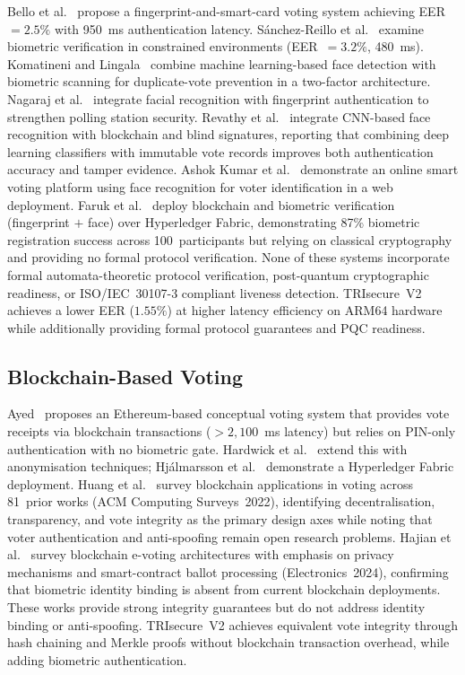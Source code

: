 \documentclass[pdflatex,sn-mathphys-num]{sn-jnl}%
\theoremstyle{thmstyleone}%
\theoremstyle{thmstyletwo}%
\theoremstyle{thmstylethree}%
\begin{document}
Bello et al.~\cite{bello2021biometric} propose a fingerprint-and-smart-card
voting system achieving EER~$=2.5\%$ with 950~ms authentication latency.
S\'{a}nchez-Reillo et al.~\cite{sanchez2020biometric} examine biometric
verification in constrained environments (EER~$=3.2\%$, 480~ms). Komatineni
and Lingala~\cite{komatineni2020biometric} combine machine learning-based face
detection with biometric scanning for duplicate-vote prevention in a two-factor
architecture. Nagaraj et al.~\cite{nagaraj2022voting} integrate facial
recognition with fingerprint authentication to strengthen polling station
security. Revathy et al.~\cite{revathy2022cnn_evoting} integrate CNN-based face
recognition with blockchain and blind signatures, reporting that combining deep
learning classifiers with immutable vote records improves both authentication
accuracy and tamper evidence. Ashok Kumar et al.~\cite{ashokkumar2023smart}
demonstrate an online smart voting platform using face recognition for voter
identification in a web deployment. Faruk et al.~\cite{faruk2024transforming}
deploy blockchain and biometric verification (fingerprint $+$ face) over
Hyperledger Fabric, demonstrating 87\% biometric registration success across
100~participants but relying on classical cryptography and providing no formal
protocol verification. None of these systems incorporate formal
automata-theoretic protocol verification, post-quantum cryptographic readiness,
or ISO/IEC~30107-3 compliant liveness detection. TRIsecure~V2 achieves a lower
EER ($1.55\%$) at higher latency efficiency on ARM64 hardware while additionally
providing formal protocol guarantees and PQC readiness.

\subsection{Blockchain-Based Voting}

Ayed~\cite{ayed2017conceptual} proposes an Ethereum-based conceptual voting
system that provides vote receipts via blockchain transactions
($>2{,}100$~ms latency) but relies on PIN-only authentication with no biometric
gate. Hardwick et al.~\cite{hardwick2018voting} extend this with anonymisation
techniques; Hj\'{a}lmarsson et al.~\cite{hjalmarsson2018blockchain} demonstrate
a Hyperledger Fabric deployment. Huang et al.~\cite{huang2022blockchain_voting}
survey blockchain applications in voting across 81~prior works (ACM Computing
Surveys~2022), identifying decentralisation, transparency, and vote integrity as
the primary design axes while noting that voter authentication and anti-spoofing
remain open research problems. Hajian et al.~\cite{hajian2024blockchain} survey
blockchain e-voting architectures with emphasis on privacy mechanisms and
smart-contract ballot processing (Electronics~2024), confirming that biometric
identity binding is absent from current blockchain deployments. These works
provide strong integrity guarantees but do not address identity binding or
anti-spoofing. TRIsecure~V2 achieves equivalent vote integrity through hash
chaining and Merkle proofs without blockchain transaction overhead, while adding
biometric authentication.
\end{document}
